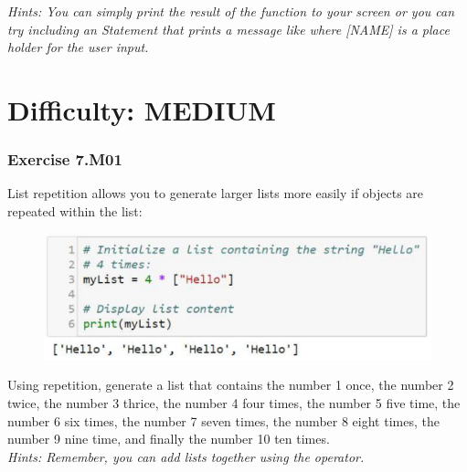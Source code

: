 \textit{Hints:
You can simply print the result of the {} function to your screen or you can try including an {} Statement that prints a message like {} where [NAME] is a place holder for the user input.
}







\newpage
\section{Difficulty: MEDIUM}


\subsubsection*{Exercise 7.M01}
List repetition allows you to generate larger lists more easily if objects are repeated within
the list:
\begin{figure}[H]
		\centering
		\includegraphics[width=\textwidth]{../IMG/7M01.png} 
\end{figure}

Using repetition, generate a list that contains the number 1 once, the number 2 twice, the
number 3 thrice, the number 4 four times, the number 5 five time, the number 6 six times,
the number 7 seven times, the number 8 eight times, the number 9 nine time, and finally the
number 10 ten times.\\


\textit{Hints:
Remember, you can add lists together using the {\code{+}} operator.}\\[1cm]




